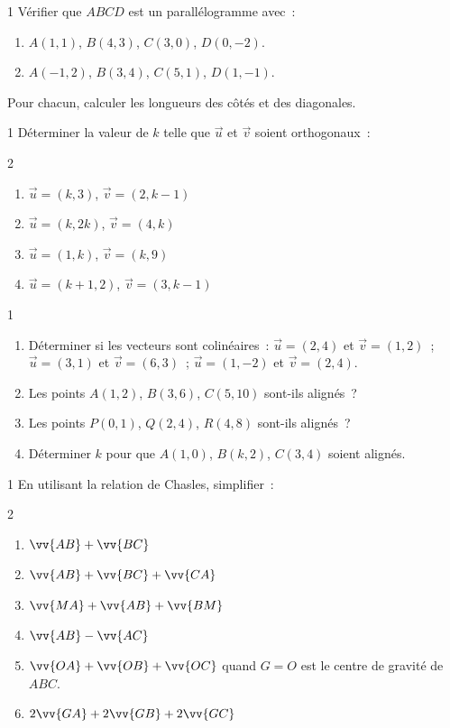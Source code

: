 \begin{exo}{1}
V\'erifier que $ABCD$ est un parall\'elogramme avec~:
\begin{enumerate}
  \item $A(1,1)$, $B(4,3)$, $C(3,0)$, $D(0,-2)$.
  \item $A(-1,2)$, $B(3,4)$, $C(5,1)$, $D(1,-1)$.
\end{enumerate}
Pour chacun, calculer les longueurs des c\^ot\'es et des diagonales.
\end{exo}

\begin{exo}{1}
D\'eterminer la valeur de $k$ telle que $\vec{u}$ et $\vec{v}$ soient orthogonaux~:
\begin{multicols}{2}
\begin{enumerate}
  \item $\vec{u}=(k,3)$, $\vec{v}=(2,k-1)$
  \item $\vec{u}=(k,2k)$, $\vec{v}=(4,k)$
  \item $\vec{u}=(1,k)$, $\vec{v}=(k,9)$
  \item $\vec{u}=(k+1,2)$, $\vec{v}=(3,k-1)$
\end{enumerate}
\end{multicols}
\end{exo}

\begin{exo}{1}
\begin{enumerate}
  \item D\'eterminer si les vecteurs sont colin\'eaires~:
        $\vec{u}=(2,4)$ et $\vec{v}=(1,2)$~;
        $\vec{u}=(3,1)$ et $\vec{v}=(6,3)$~;
        $\vec{u}=(1,-2)$ et $\vec{v}=(2,4)$.
  \item Les points $A(1,2)$, $B(3,6)$, $C(5,10)$ sont-ils align\'es~?
  \item Les points $P(0,1)$, $Q(2,4)$, $R(4,8)$ sont-ils align\'es~?
  \item D\'eterminer $k$ pour que $A(1,0)$, $B(k,2)$, $C(3,4)$ soient align\'es.
\end{enumerate}
\end{exo}

\begin{exo}{1}
En utilisant la relation de Chasles, simplifier~:
\begin{multicols}{2}
\begin{enumerate}
  \item $\vv{AB}+\vv{BC}$
  \item $\vv{AB}+\vv{BC}+\vv{CA}$
  \item $\vv{MA}+\vv{AB}+\vv{BM}$
  \item $\vv{AB}-\vv{AC}$
  \item $\vv{OA}+\vv{OB}+\vv{OC}$ quand $G=O$ est le centre de gravité de $ABC$.
  \item $2\vv{GA}+2\vv{GB}+2\vv{GC}$
\end{enumerate}
\end{multicols}
\end{exo}

